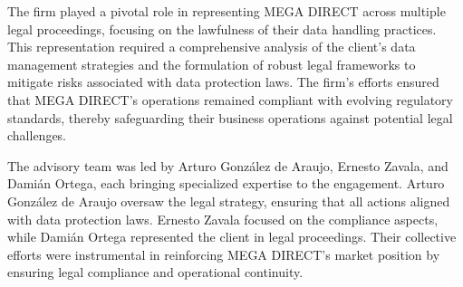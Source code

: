 \documentclass[11pt]{article}
\begin{document}
\begin{itemize}
The firm played a pivotal role in representing MEGA DIRECT across multiple legal proceedings, focusing on the lawfulness of their data handling practices. This representation required a comprehensive analysis of the client's data management strategies and the formulation of robust legal frameworks to mitigate risks associated with data protection laws. The firm's efforts ensured that MEGA DIRECT's operations remained compliant with evolving regulatory standards, thereby safeguarding their business operations against potential legal challenges.

The advisory team was led by Arturo González de Araujo, Ernesto Zavala, and Damián Ortega, each bringing specialized expertise to the engagement. Arturo González de Araujo oversaw the legal strategy, ensuring that all actions aligned with data protection laws. Ernesto Zavala focused on the compliance aspects, while Damián Ortega represented the client in legal proceedings. Their collective efforts were instrumental in reinforcing MEGA DIRECT's market position by ensuring legal compliance and operational continuity.


\end{itemize}
\end{document}
